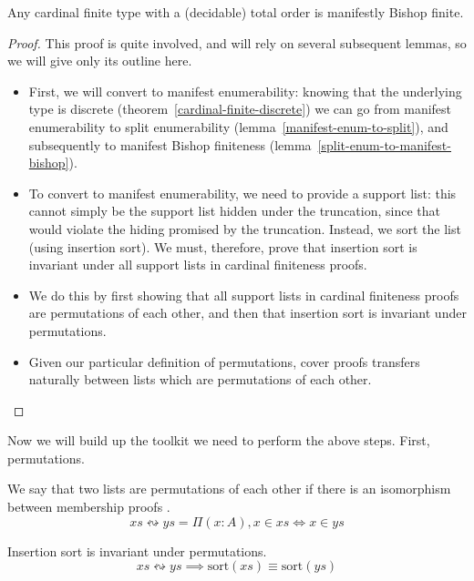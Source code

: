 \begin{rm-theorem}
  Any cardinal finite type with a (decidable) total order is manifestly Bishop
  finite.
\end{rm-theorem}
\begin{proof}
  This proof is quite involved, and will rely on several subsequent lemmas, so
  we will give only its outline here.
  \begin{itemize}
    \item First, we will convert to manifest enumerability: knowing that the
      underlying type is discrete (theorem~\ref{cardinal-finite-discrete}) we can
      go from manifest enumerability to split enumerability
      (lemma~\ref{manifest-enum-to-split}), and subsequently to manifest Bishop
      finiteness (lemma~\ref{split-enum-to-manifest-bishop}).
    \item To convert to manifest enumerability, we need to provide a support
      list: this cannot simply be the support list hidden under the truncation,
      since that would violate the hiding promised by the truncation.
      Instead, we sort the list (using insertion sort).
      We must, therefore, prove that insertion sort is invariant under all
      support lists in cardinal finiteness proofs.
    \item We do this by first showing that all support lists in cardinal
      finiteness proofs are permutations of each other, and then that insertion
      sort is invariant under permutations.
    \item Given our particular definition of permutations, cover proofs
      transfers naturally between lists which are permutations of each other.
  \end{itemize} 
\end{proof}
Now we will build up the toolkit we need to perform the above steps.
First, permutations.
\begin{rm-definition}
  We say that two lists are permutations of each other if there is an
  isomorphism between membership proofs
  \cite{danielssonBagEquivalenceProofRelevant2012}.
  \begin{equation}
    \mathit{xs} \leftrightsquigarrow \mathit{ys} = \Pi {(x : A)} , x \in \mathit{xs} \iff x \in \mathit{ys}
  \end{equation}
\end{rm-definition}
\begin{rm-lemma}
  Insertion sort is invariant under permutations.
  \begin{equation}
    \mathit{xs} \leftrightsquigarrow \mathit{ys} \implies \text{sort}(\mathit{xs}) \equiv \text{sort}(\mathit{ys})
  \end{equation}
\end{rm-lemma}

